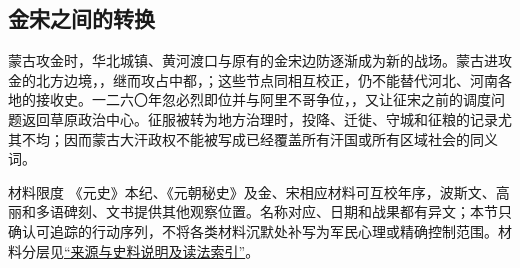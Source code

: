\subsection{金宋之间的转换}
蒙古攻金时，华北城镇、黄河渡口与原有的金宋边防逐渐成为新的战场。蒙古进攻金的北方边境，，继而攻占中都，；这些节点同相互校正，仍不能替代河北、河南各地的接收史。一二六〇年忽必烈即位并与阿里不哥争位，，又让征宋之前的调度问题返回草原政治中心。征服被转为地方治理时，投降、迁徙、守城和征粮的记录尤其不均；因而蒙古大汗政权不能被写成已经覆盖所有汗国或所有区域社会的同义词。

\begin{sourcenote}{材料限度}
《元史》本纪、《元朝秘史》及金、宋相应材料可互校年序，波斯文、高丽和多语碑刻、文书提供其他观察位置。名称对应、日期和战果都有异文；本节只确认可追踪的行动序列，不将各类材料沉默处补写为军民心理或精确控制范围。材料分层见\hyperref[app:sources]{“来源与史料说明及读法索引”}。
\end{sourcenote}
